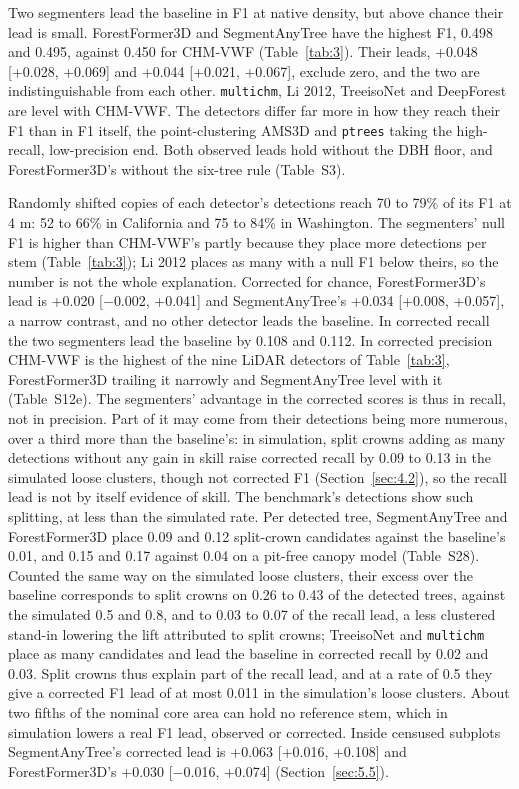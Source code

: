 \documentclass[journal]{IEEEtran}
\begin{document}
Two segmenters lead the baseline in F1 at native density, but above chance their
lead is small. ForestFormer3D and SegmentAnyTree have the highest F1, 0.498 and
0.495, against 0.450 for CHM-VWF (Table~\ref{tab:3}). Their leads, +0.048 [+0.028, +0.069]
and +0.044 [+0.021, +0.067], exclude zero, and the two are indistinguishable
from each other. \texttt{multichm}, Li 2012, TreeisoNet and DeepForest are level with
CHM-VWF. The detectors differ far more in how they reach their F1 than in F1
itself, the point-clustering AMS3D and \texttt{ptrees} taking the high-recall,
low-precision end. Both observed leads hold without the DBH floor, and
ForestFormer3D's without the six-tree rule (Table~S3).

Randomly shifted copies of each detector's detections reach 70 to 79\% of its F1
at 4 m: 52 to 66\% in California and 75 to 84\% in Washington. The segmenters'
null F1 is higher than CHM-VWF's partly because they place more detections per
stem (Table~\ref{tab:3}); Li 2012 places as many with a null F1 below theirs, so the
number is not the whole explanation. Corrected for chance, ForestFormer3D's lead
is +0.020 [$-$0.002, +0.041] and SegmentAnyTree's +0.034 [+0.008, +0.057], a
narrow contrast, and no other detector leads the baseline. In corrected recall
the two segmenters lead the baseline by 0.108 and 0.112. In corrected precision
CHM-VWF is the highest of the nine LiDAR detectors of Table~\ref{tab:3}, ForestFormer3D
trailing it narrowly and SegmentAnyTree level with it (Table~S12e). The
segmenters' advantage in the corrected scores is thus in recall, not in
precision. Part of it may come from their detections being more numerous, over a
third more than the baseline's: in simulation, split crowns adding as many
detections without any gain in skill raise corrected recall by 0.09 to 0.13 in
the simulated loose clusters, though not corrected F1 (Section~\ref{sec:4.2}), so the
recall lead is not by itself evidence of skill. The benchmark's detections
show such splitting, at less than the simulated rate. Per detected tree,
SegmentAnyTree and ForestFormer3D place 0.09 and 0.12 split-crown candidates
against the baseline's 0.01, and 0.15 and 0.17 against 0.04 on a pit-free canopy
model (Table~S28). Counted the same way on the simulated loose clusters, their
excess over the baseline corresponds to split crowns on 0.26 to 0.43 of the
detected trees, against the simulated 0.5 and 0.8, and to 0.03 to 0.07 of the
recall lead, a less clustered stand-in lowering the lift attributed to split
crowns; TreeisoNet and \texttt{multichm} place as many candidates and lead the
baseline in corrected recall by 0.02 and 0.03. Split crowns thus explain part
of the recall lead, and at a rate of 0.5 they give a corrected F1 lead of at
most 0.011 in the simulation's loose clusters. About two fifths of the nominal
core area can hold no reference stem, which in simulation lowers a real F1
lead, observed or corrected. Inside censused subplots SegmentAnyTree's
corrected lead is +0.063 [+0.016, +0.108] and ForestFormer3D's +0.030 [$-$0.016,
+0.074] (Section~\ref{sec:5.5}).
\end{document}
